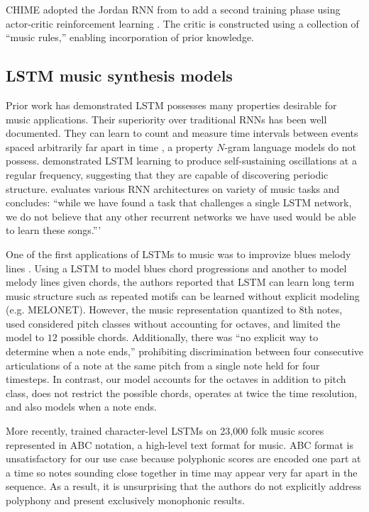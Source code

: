 \documentclass[dissertation.tex]{subfiles}
\begin{document}
CHIME \cite{franklin2001learning} adopted the Jordan RNN from
\cite{todd1989connectionist} to add a second training phase using actor-critic
reinforcement learning \cite{sutton1998reinforcement}. The critic is
constructed using a collection of ``music rules,'' enabling incorporation of
prior knowledge.

\subsection{LSTM music synthesis models}

Prior work has demonstrated LSTM possesses many properties desirable for music
applications. Their superiority over traditional RNNs has been well
documented\cite{gers2001lstm}. They can learn to count and measure time
intervals between events spaced arbitrarily far apart in time
\cite{gers2000recurrent}, a property $N$-gram language models do not possess.
\cite{gers2002learning} demonstrated LSTM learning to produce self-sustaining
oscillations at a regular frequency, suggesting that they are capable of
discovering periodic structure. \cite{franklin2006recurrent} evaluates various
RNN architectures on variety of music tasks and concludes: ``while we have
found a task that challenges a single LSTM network, we do not believe that any
other recurrent networks we have used would be able to learn these songs.'''

One of the first applications of LSTMs to music was to improvize blues melody
lines \cite{Eck2002}\cite{Eck2002-blues}. Using a LSTM to model blues chord
progressions and another to model melody lines given chords, the authors
reported that LSTM can learn long term music structure such as repeated motifs
can be learned without explicit modeling (e.g. MELONET). However, the music
representation quantized to 8th notes, used considered pitch classes without
accounting for octaves, and limited the model to $12$ possible chords.
Additionally, there was ``no explicit way to determine when a note ends,''
prohibiting discrimination between four consecutive articulations of a note at
the same pitch from a single note held for four timesteps. In contrast, our
model accounts for the octaves in addition to pitch class, does not restrict
the possible chords, operates at twice the time resolution, and also
models when a note ends.

More recently, \cite{sturm2015folk} \cite{sturm2016music} trained
character-level LSTMs on 23,000 folk music scores represented in ABC
notation\cite{abcstandard}, a high-level text format for music. ABC format is
unsatisfactory for our use case because polyphonic scores are encoded one part
at a time so notes sounding close together in time may appear very far apart in
the sequence. As a result, it is unsurprising that the authors do not
explicitly address polyphony and present exclusively monophonic results.
\end{document}
